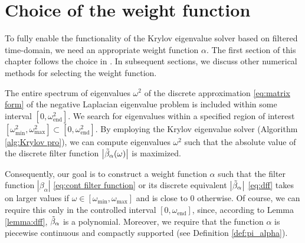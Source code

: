 \documentclass[a4paper,11pt,bibliography=totoc,listof=totoc,headinclude=true,cleardoublepage=empty,oneside]{scrbook}
\newcommand{\dff}{\Tilde{\beta}_\alpha}
\newcommand{\e}{\mathrm{end}}
\begin{document}
\chapter{Choice of the weight function}
\label{chapter:function}
To fully enable the functionality of the Krylov eigenvalue solver based on filtered time-domain, we need an appropriate weight function $\alpha$. The first section of this chapter follows the choice in \cite{nannen}. In subsequent sections, we discuss other numerical methods for selecting the weight function.

The entire spectrum of eigenvalues $\omega^2$ of the discrete approximation \eqref{eq:matrix form} of the negative Laplacian eigenvalue problem is included within some interval $\left[0, \omega_\e^2\right]$. We search for eigenvalues within a specified region of interest $\left[\omega_{\min}^2, \omega_{\max}^2\right] \subset \left[0, \omega_\e^2\right]$. By employing the Krylov eigenvalue solver (Algorithm \ref{alg:Krylov pro}), we can compute eigenvalues $\omega^2$ such that the absolute value of the discrete filter function $\left|\dff(\omega)\right|$ is maximized.

Consequently, our goal is to construct a weight function $\alpha$ such that the filter function $\left|\beta_\alpha\right|$ \eqref{eq:cont filter function} or its discrete equivalent $\left|\dff\right|$ \eqref{eq:dff} takes on larger values if $\omega \in \left[\omega_{\min}, \omega_{\max} \right]$ and is close to 0 otherwise. Of course, we can require this only in the controlled interval $\left[0, \omega_\e\right]$, since, according to Lemma \ref{lemma:dff}, $\dff$ is a polynomial. Moreover, we require that the function $\alpha$ is piecewise continuous and compactly supported (see Definition \ref{def:pi_alpha}).
\end{document}

